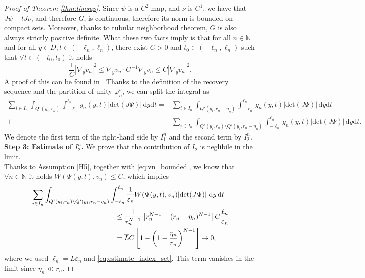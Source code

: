\documentclass[a4paper, 11pt, reqno]{amsart}
\theoremstyle{plain}
\theoremstyle{definition}
\theoremstyle{remark}
\newcommand{\N}{\mathbb N}
\newcommand{\dd}{\,\mathrm{d}}
\begin{document}
\begin{proof}[Proof of Theorem \ref{thm:limsup}]
Since $\psi$ is a $C^2$ map, and $\nu$ is $C^1$, we have that $J\psi + t J\nu$, and therefore $G$, is continuous, therefore its norm is bounded on compact sets. Moreover, thanks to tubular neighborhood theorem, $G$ is also always strictly positive definite. What these two facts imply is that for all $n \in \N$ and for all $y \in D, t \in (-\ell_n, \ell_n)$, there exist $C > 0$ and $t_0 \in (-\ell_n, \ell_n)$ such that $\forall t \in (-t_0,t_0)$ it holds
\begin{equation}\label{eq:tangential_derivative}
    \frac1C | \nabla_y v_n |^2 \leq \nabla_y v_n \cdot G^{-1} \nabla_y v_n \leq C | \nabla_y v_n |^2.
\end{equation}
A proof of this can be found in \cite[Lemma 2.3]{lotoreichik2023spectralasymptoticsdiracoperator}.
Thanks to the definition of the recovery sequence and the partition of unity $\varphi_n^i$, we can split the integral as
\begin{align*}
    \sum_{i \in I_n} \int_{Q'(y_i, r_n)} \int_{-\ell_n}^{\ell_n} g_n (y,t) | \mathrm{det}(J\Psi)| \,\mathrm{d}y \mathrm{d}t = &\sum_{i \in I_n} \int_{Q'(y_i,r_n-\eta_n)} \int_{-\ell_n}^{\ell_n} g_n (y,t) | \mathrm{det}(J\Psi)| \, \mathrm{d} y \mathrm{d} t \\
    + &\sum_{i \in I_n} \int_{Q'(y_i,r_n) \setminus Q'(y_i, r_n - \eta_n)} \int_{-\ell_n}^{\ell_n} g_n (y,t) | \mathrm{det}(J\Psi)| \, \mathrm{d} y \mathrm{d} t.
\end{align*}
We denote the first term of the right-hand side by $I_1^n$ and the second term by $I_2^n$. \\[0.5em]
\textbf{Step 3: Estimate of $I_2^n$.}
We prove that the contribution of $I_2$ is neglibile in the limit.\\
Thanks to Assumption \ref{H5}, together with \eqref{eq:vn_bounded}, we know that $\forall n \in \N$ it holds $W(\Psi(y,t), v_n) \leq C$, which implies
\begin{align*}
    &\sum_{i \in I_n} \int_{Q'(y_i,r_n) \setminus Q'(y_i, r_n - \eta_n)} \int_{-\ell_n}^{\ell_n} \cfrac{1}{\varepsilon_n} W(\Psi(y,t),v_n) | \mathrm{det}(J\Psi)|\, \dd y \dd t \\
    &\qquad \qquad \qquad\qquad \qquad\qquad\leq \frac{1}{r_n^{N-1}} \left[ r_n^{N-1} - (r_n - \eta_n)^{N-1} \right] C \frac{\ell_n}{\varepsilon_n} \\
    &\qquad \qquad \qquad\qquad \qquad\qquad= \overline{L} C \left[ 1 - \left( 1 - \frac{\eta_n}{r_n} \right)^{N-1} \right] \to 0,
\end{align*}
where we used $\ell_n = \overline{L} \varepsilon_n$ and \eqref{eq:estimate_index_set}.
This term vanishes in the limit since $\eta_n \ll r_n$.


\end{proof}
\end{document}
